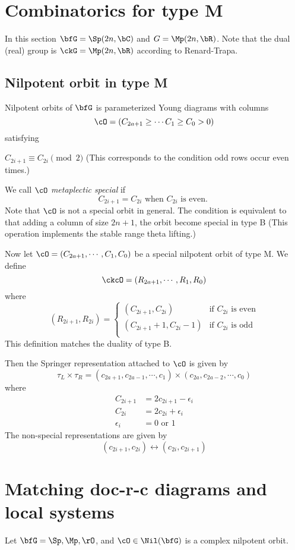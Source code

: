 \documentclass[12pt,a4paper]{amsart}
\numberwithin{equation}{section}
\theoremstyle{remark}
\begin{document}
\section{Combinatorics for type M }
In this section $\bfG = \Sp(2n,\bC)$ and $G = \Mp(2n,\bR)$.
Note that the dual (real) group is $\ckG= \Mp(2n,\bR)$ according to Renard-Trapa.

\subsection{Nilpotent orbit in type M}
Nilpotent orbits of $\bfG$ is parameterized Young diagrams with columns
\[
  \cO = (C_{2a+1} \geq\cdots C_{1} \geq C_0 > 0)
\]
satisfying
\begin{enumC}
\item [] $C_{2i+1} \equiv C_{2i } \pmod{2}$ (This corresponds to the condition odd rows occur
  even times.) 
\end{enumC}

We call $\cO$ \emph{metaplectic special} if 
\[
  C_{2i+1} = C_{2i} \text{ when $C_{2i}$ is even. }
\]
Note that $\cO$ is not a special orbit in general. 
The condition is equivalent to that adding a column of size $2n+1$, the orbit
become special in type B (This operation implements the stable range theta lifting.) 


Now let $\cO = (C_{2a+1}, \cdots, C_1, C_0)$ be a special nilpotent
orbit of type M.
We define 
\[
  \ckcO = (R_{2a+1}, \cdots, R_1, R_0)
\]
where
\[
    (R_{2i+1}, R_{2i})  =
    \begin{cases}
      (C_{2i+1},C_{2i}) & \text{if } C_{2i} \text{ is even}\\
      (C_{2i+1}+1,C_{2i}-1) & \text{if } C_{2i} \text{ is odd}\\
    \end{cases}
\]
This definition matches the duality of type B.

Then the Springer representation attached to $\cO$ is given by
\[
  \tau_L\times \tau_R = (c_{2a+1}, c_{2a-1}, \cdots, c_1)\times (c_{2a},
  c_{2a-2}, \cdots, c_0)
\]
where
\[
  \begin{split}
    C_{2i+1} & = 2 c_{2i+1} - \epsilon_i\\
    C_{2i} & = 2 c_{2i} + \epsilon_i\\
    \epsilon_i & = 0 \text{ or } 1
  \end{split}
\]
The non-special representations are given by
\[
  (c_{2i+1}, c_{2i}) \leftrightarrow (c_{2i}, c_{2i+1})
\]


\section{Matching doc-r-c diagrams and local systems}
Let $\bfG = \Sp, \Mp, \rO$, and $\cO\in \Nil(\bfG)$ is a complex nilpotent orbit.
\end{document}
